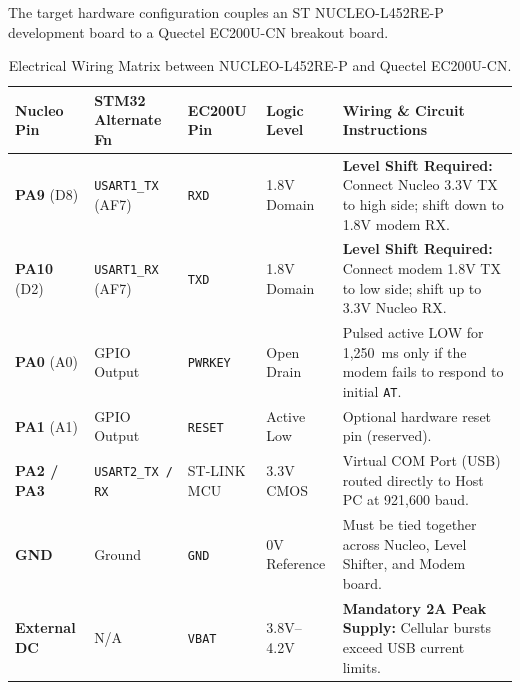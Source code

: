 \documentclass[11pt,a4paper]{article}
\newcommand{\code}[1]{\texttt{#1}}
\begin{document}
The target hardware configuration couples an ST NUCLEO-L452RE-P development board to a Quectel EC200U-CN breakout board.

\begin{table}[htbp]
\centering
\small
\begin{tabularx}{\textwidth}{l l l l X}
\toprule
\textbf{Nucleo Pin} & \textbf{STM32 Alternate Fn} & \textbf{EC200U Pin} & \textbf{Logic Level} & \textbf{Wiring \& Circuit Instructions} \\
\midrule
\textbf{PA9} (D8) & \code{USART1\_TX} (AF7) & \code{RXD} & 1.8V Domain & \textbf{Level Shift Required:} Connect Nucleo 3.3V TX to high side; shift down to 1.8V modem RX. \\
\addlinespace
\textbf{PA10} (D2) & \code{USART1\_RX} (AF7) & \code{TXD} & 1.8V Domain & \textbf{Level Shift Required:} Connect modem 1.8V TX to low side; shift up to 3.3V Nucleo RX. \\
\addlinespace
\textbf{PA0} (A0) & GPIO Output & \code{PWRKEY} & Open Drain & Pulsed active LOW for 1,250~ms only if the modem fails to respond to initial \code{AT}. \\
\addlinespace
\textbf{PA1} (A1) & GPIO Output & \code{RESET} & Active Low & Optional hardware reset pin (reserved). \\
\addlinespace
\textbf{PA2 / PA3} & \code{USART2\_TX / RX} & ST-LINK MCU & 3.3V CMOS & Virtual COM Port (USB) routed directly to Host PC at 921,600 baud. \\
\addlinespace
\textbf{GND} & Ground & \code{GND} & 0V Reference & Must be tied together across Nucleo, Level Shifter, and Modem board. \\
\addlinespace
\textbf{External DC} & N/A & \code{VBAT} & 3.8V--4.2V & \textbf{Mandatory 2A Peak Supply:} Cellular bursts exceed USB current limits. \\
\bottomrule
\end{tabularx}
\caption{Electrical Wiring Matrix between NUCLEO-L452RE-P and Quectel EC200U-CN.}
\label{tab:wiring}
\end{table}
\end{document}
